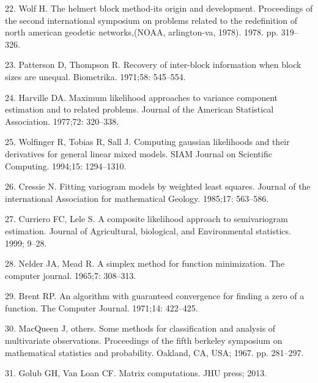 \documentclass[10pt,letterpaper]{article}
\begin{document}
\leavevmode\hypertarget{ref-wolf1978helmert}{}%
22. Wolf H. The helmert block method-its origin and development.
Proceedings of the second international symposium on problems related to
the redefinition of north american geodetic networks,(NOAA,
arlington-va, 1978). 1978. pp. 319--326.

\leavevmode\hypertarget{ref-patterson1971recovery}{}%
23. Patterson D, Thompson R. Recovery of inter-block information when
block sizes are unequal. Biometrika. 1971;58: 545--554.

\leavevmode\hypertarget{ref-harville1977maximum}{}%
24. Harville DA. Maximum likelihood approaches to variance component
estimation and to related problems. Journal of the American Statistical
Association. 1977;72: 320--338.

\leavevmode\hypertarget{ref-wolfinger1994computing}{}%
25. Wolfinger R, Tobias R, Sall J. Computing gaussian likelihoods and
their derivatives for general linear mixed models. SIAM Journal on
Scientific Computing. 1994;15: 1294--1310.

\leavevmode\hypertarget{ref-cressie1985fitting}{}%
26. Cressie N. Fitting variogram models by weighted least squares.
Journal of the international Association for mathematical Geology.
1985;17: 563--586.

\leavevmode\hypertarget{ref-curriero1999composite}{}%
27. Curriero FC, Lele S. A composite likelihood approach to
semivariogram estimation. Journal of Agricultural, biological, and
Environmental statistics. 1999; 9--28.

\leavevmode\hypertarget{ref-nelder1965simplex}{}%
28. Nelder JA, Mead R. A simplex method for function minimization. The
computer journal. 1965;7: 308--313.

\leavevmode\hypertarget{ref-brent1971algorithm}{}%
29. Brent RP. An algorithm with guaranteed convergence for finding a
zero of a function. The Computer Journal. 1971;14: 422--425.

\leavevmode\hypertarget{ref-macqueen1967some}{}%
30. MacQueen J, others. Some methods for classification and analysis of
multivariate observations. Proceedings of the fifth berkeley symposium
on mathematical statistics and probability. Oakland, CA, USA; 1967. pp.
281--297.

\leavevmode\hypertarget{ref-golub2013matrix}{}%
31. Golub GH, Van Loan CF. Matrix computations. JHU press; 2013.

\nolinenumbers
\end{document}
